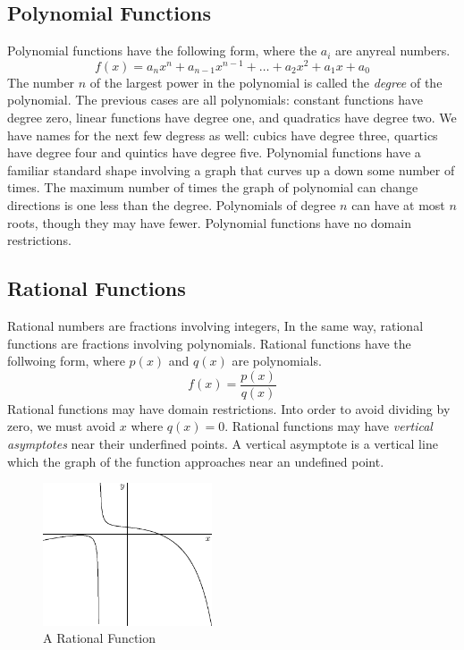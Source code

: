 \documentclass[fleqn]{report}
\begin{document}
\subsection{Polynomial Functions}
\label{polynomials}

Polynomial functions have the following form, where the $a_i$
are anyreal numbers.
\begin{equation*}
f(x) = a_nx^n + a_{n-1}x^{n-1} + \ldots + a_2x^2 + a_1 x + a_0
\end{equation*}
The number $n$ of the largest power in the polynomial is
called the \emph{degree} of the polynomial. The previous
cases are all polynomials: constant functions have degree
zero, linear functions have degree one, and quadratics have
degree two. We have names for the next few degress as well:
cubics have degree three, quartics have degree four and
quintics have degree five. Polynomial functions have a
familiar standard shape involving a graph that curves up a
down some number of times. The maximum number of times the
graph of polynomial can change directions is one less than the
degree. Polynomials of degree $n$ can have at most $n$ roots,
though they may have fewer. Polynomial functions have no
domain restrictions. 

\subsection{Rational Functions}
\label{rational-functions}

Rational numbers are fractions involving integers, In the same
way, rational functions are fractions involving polynomials.
Rational functions have the follwoing form, where $p(x)$ and
$q(x)$ are polynomials.
\begin{equation*}
f(x) = \frac{p(x)}{q(x)} 
\end{equation*}
Rational functions may have domain
restrictions. Into order to avoid dividing by zero, we must
avoid $x$ where $q(x) = 0$. Rational functions may have
\emph{vertical asymptotes} near their underfined points. A
vertical asymptote is a vertical line which the graph of the 
function approaches near an undefined point. 

\begin{figure}[t]
\centering
\includegraphics[width=5cm]{figure29.eps}
\caption{A Rational Function}
\label{figure-rational-function}
\end{figure}
\end{document}
